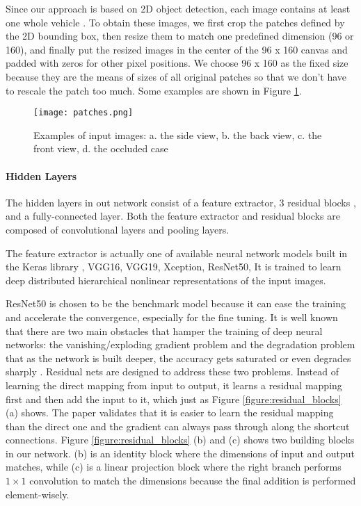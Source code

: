 Since our approach is based on 2D object detection, each image contains at least one whole vehicle . To obtain these images, we first crop the patches defined by the 2D bounding box, then resize them to match one predefined dimension (96 or 160), and finally put the resized images in the center of the 96 x 160 canvas and padded with zeros for other pixel positions. We choose 96 x 160 as the fixed size because they are the means of sizes of all original patches so that we don't have to rescale the patch too much.  Some examples are shown in Figure \ref{figure:patches}.

\begin{figure}[h]		
	\texttt{[image: patches.png]}
	\caption{Examples of input images: a. the side view, b. the back view, c. the front view, d. the occluded case}
	\centering
	\label{figure:patches}
\end{figure}

\paragraph{Hidden Layers}
The hidden layers in out network consist of a feature extractor, 3 residual blocks \cite{DBLP:journals/corr/HeZRS15}, and a fully-connected layer. Both the feature extractor and residual blocks are composed of convolutional layers and pooling layers.

The feature extractor is actually one of available neural network models built in the Keras library \cite{chollet2015keras}, \ie VGG16, VGG19, Xception, ResNet50, \etc It is trained to  learn deep distributed hierarchical nonlinear representations of the input images.

 ResNet50 \cite{DBLP:journals/corr/HeZRS15} is chosen to be the benchmark model because it can ease the training and accelerate the convergence, especially for the fine tuning. It is well known that there are two main obstacles that hamper the training of deep neural networks: the vanishing/exploding gradient problem \cite{Bengio:1994:LLD:2325857.2328340, pmlr-v9-glorot10a} and the degradation problem that as the network is built deeper, the accuracy gets saturated or even degrades sharply \cite{DBLP:journals/corr/He014}. Residual nets are designed to address these two problems. Instead of learning the direct mapping from input to output, it learns a residual mapping first and then add the input to it, which just as Figure \ref{figure:residual_blocks} (a) shows. The paper validates that it is easier to learn the residual mapping than the direct one and the gradient can always pass through along the shortcut connections. Figure \ref{figure:residual_blocks} (b) and (c) shows two building blocks in our network. (b) is an identity block where the dimensions of input and output matches, while (c) is a linear projection block where the right branch performs $1\times1$ convolution to match the dimensions because the final addition is performed element-wisely.

